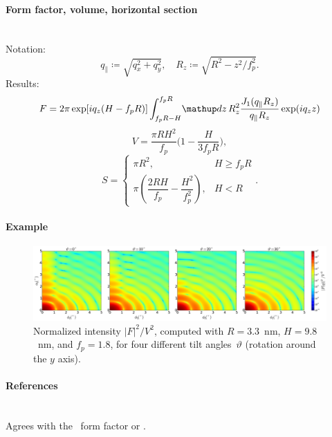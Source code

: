 \paragraph{Form factor, volume, horizontal section}\strut\\
Notation:
\begin{equation*}
  q_{\parallel} \coloneqq \sqrt{q_x^2+q_y^2}, \quad
  R_z \coloneqq \sqrt{R^2-z^2/f_p^2}.
\end{equation*}
Results:
\begin{equation*}
F =   2\pi \exp[iq_z(H-f_pR)] \int_{f_p R-H}^{f_p R} \!\d z\,
     R_z^2\frac{J_1(q_{\parallel}R_z)}{q_{\parallel}R_z} \exp(i q_z z)
\end{equation*}
\begin{equation*}
  V = \dfrac{\pi R H^2}{f_p}  \Big(1-\dfrac{H}{3f_p R}\Big),
\end{equation*}
\begin{equation*}
  S = \left\{\begin{array}{ll} \pi R^2, & H \geq f_pR \\
         \pi\left(\dfrac{2RH}{f_p}-\dfrac{H^2}{f_p^2}\right), & H < R \end{array}\right..
\end{equation*}

\paragraph{Example}\strut

\begin{figure}[H]
\begin{center}
\includegraphics[width=\textwidth]{fig/ff2/ff_TruncatedSpheroid.pdf}
\end{center}
\caption{Normalized intensity $|F|^2/V^2$,
computed with $R=3.3$~nm, $H=9.8$~nm, and $f_p=1.8$,
for four different tilt angles~$\vartheta$ (rotation around the $y$ axis).}
\end{figure}

\paragraph{References}\strut\\
Agrees with the \IsGISAXS\ form factor
 \cite[Eq.~2.33]{Laz08} or
 \cite[Eq.~228]{ReLL09}.

